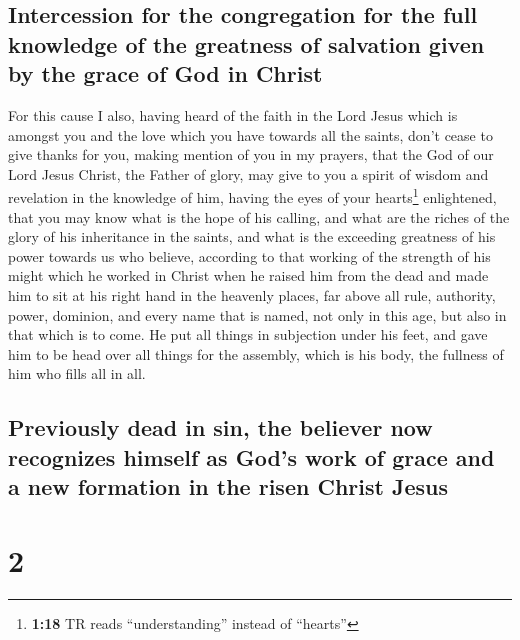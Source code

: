 \hypertarget{intercession-for-the-congregation-for-the-full-knowledge-of-the-greatness-of-salvation-given-by-the-grace-of-god-in-christ}{%
\subsection{Intercession for the congregation for the full knowledge of
the greatness of salvation given by the grace of God in
Christ}\label{intercession-for-the-congregation-for-the-full-knowledge-of-the-greatness-of-salvation-given-by-the-grace-of-god-in-christ}}

 For this cause I also, having heard of the faith in the
Lord Jesus which is amongst you and the love which you have towards all
the saints,  don't cease to give thanks for you, making
mention of you in my prayers,  that the God of our Lord
Jesus Christ, the Father of glory, may give to you a spirit of wisdom
and revelation in the knowledge of him,  having the eyes
of your hearts\footnote{\textbf{1:18} TR reads ``understanding'' instead
  of ``hearts''} enlightened, that you may know what is the hope of his
calling, and what are the riches of the glory of his inheritance in the
saints,  and what is the exceeding greatness of his power
towards us who believe, according to that working of the strength of his
might  which he worked in Christ when he raised him from
the dead and made him to sit at his right hand in the heavenly places,
 far above all rule, authority, power, dominion, and
every name that is named, not only in this age, but also in that which
is to come.  He put all things in subjection under his
feet, and gave him to be head over all things for the assembly,
 which is his body, the fullness of him who fills all in
all.

\hypertarget{previously-dead-in-sin-the-believer-now-recognizes-himself-as-gods-work-of-grace-and-a-new-formation-in-the-risen-christ-jesus}{%
\subsection{Previously dead in sin, the believer now recognizes himself
as God's work of grace and a new formation in the risen Christ
Jesus}\label{previously-dead-in-sin-the-believer-now-recognizes-himself-as-gods-work-of-grace-and-a-new-formation-in-the-risen-christ-jesus}}

\hypertarget{section-1}{%
\section{2}\label{section-1}}

